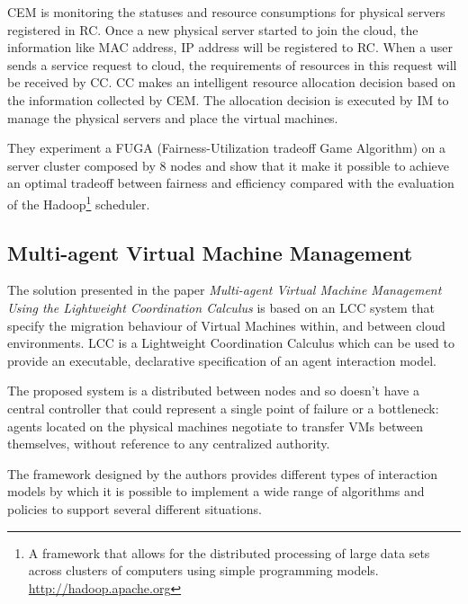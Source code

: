 CEM is monitoring the statuses and resource consumptions for physical servers registered in RC. Once a new physical server started to join the cloud, the information like MAC address, IP address will be registered to RC. When a user sends a service request to cloud, the requirements of resources in this request will be received by CC. CC makes an intelligent resource allocation decision based on the information collected by CEM. The allocation decision is executed by IM to manage the physical servers and place the virtual machines.\cite[p.~3]{Xu:2014do}

They experiment a FUGA (Fairness-Utilization tradeoff Game Algorithm) on a server cluster composed by 8 nodes and show that it make it possible to achieve an optimal tradeoff between fairness and efficiency compared with the evaluation of the Hadoop\footnote{A framework that allows for the distributed processing of large data sets across clusters of computers using simple programming models. \url{http://hadoop.apache.org}} scheduler.

\subsection{Multi-agent Virtual Machine Management}
\label{sec:sota_mutli_agent}
The solution presented in the paper \textit{Multi-agent Virtual Machine Management Using the Lightweight Coordination Calculus} is based on an LCC system that specify the migration behaviour of Virtual Machines within, and between cloud environments. LCC is a Lightweight Coordination Calculus which can be used to provide an executable, declarative specification of an agent interaction model\cite{Anderson:2013bh}.

The proposed system is a distributed between nodes and so doesn't have a central controller that could represent a single point of failure or a bottleneck: agents located on the physical machines negotiate to transfer VMs between themselves, without reference to any centralized authority\cite[p.~124]{Anderson:2013bh}.

The framework designed by the authors provides different types of interaction models by which it is possible to implement a wide range of algorithms and policies to support several different situations.

